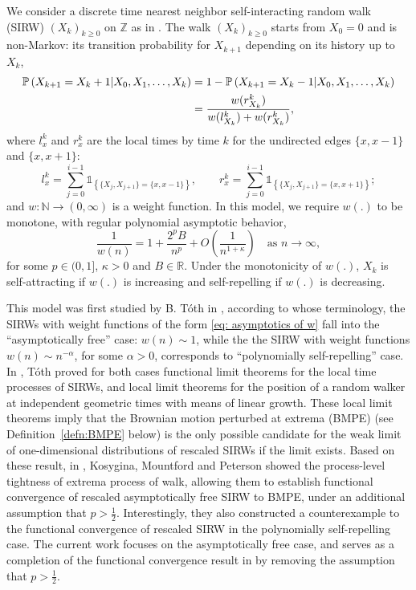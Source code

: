 \documentclass[twoside,12pt,a4paper]{article}
\numberwithin{equation}{section}
\newcommand\TBD{\textcolor{red}{TBD.}}
\begin{document}
	We consider a discrete time nearest neighbor self-interacting random walk (SIRW) $(X_k)_{k\geq 0}$ on $\mathbb{Z}$ as in \cite{T96,KMP22}. The walk $(X_k)_{k\geq 0}$ starts from $X_0 = 0$ and is non-Markov: its transition probability for $X_{k+1}$ depending on its history up to $X_k$, 
	\begin{align}
		\mathbb{P}\left( X_{k+1} =  X_k+1 \middle| X_0, X_1,\dots, X_k   \right) 
		&=1- \mathbb{P}\left( X_{k+1} =  X_k-1 \middle| X_0, X_1,\dots, X_k   \right)  
		\notag
		\\
		&=  \frac{  w(r_{X_k}^k)}{ w(l_{X_k}^k)  + w(r_{X_k}^k)   }
		, \label{dynamic}
	\end{align}
	where $l_x^k$ and $r_x^k$ are the local times by time $k$ for the undirected edges $\{x,x-1\}$ and $\{x,x+1\}$:
	\[ 
	l_x^k = \sum_{j=0}^{i-1} \mathbb{1}_{ \left\{  \{X_j, X_{j+1}\} =  \{x,x-1\} \right\} }, \qquad
	r_x^k = \sum_{j=0}^{i-1} \mathbb{1}_{ \left\{  \{X_j, X_{j+1}\} =  \{x,x+1\} \right\} }   
	;\]
	and $
	w: \mathbb{N} \to  (0, \infty )
	$ 
	is a weight function.
	In this model, we require $w(.)$ to be monotone, with regular polynomial asymptotic behavior,
	\begin{equation}\label{eq: asymptotics of w}
		\frac{1}{w(n)} = 1 + \frac{2^p B}{n^p} + O\left(\frac{1}{n^{1+\mathcal{\kappa}}}\right) \quad \mbox{as $n\to \infty$}, 	
	\end{equation} 
	for some $p \in (0,1]$, $\kappa>0$ and $B\in \mathbb{R}$. Under the monotonicity of $w(.)$, $X_k$ is self-attracting if $w(.)$ is increasing and self-repelling if $w(. )$ is decreasing.
	
	This model was first studied by B. T\'oth in \cite{T96}, according to whose terminology, the SIRWs with weight functions of the form \eqref{eq: asymptotics of w} fall into the ``asymptotically free'' case: $w(n)\sim 1$, while the the SIRW with weight functions $w(n)\sim n^{-\alpha}$, for some $\alpha >0$, corresponds to ``polynomially self-repelling'' case. In \cite{T96}, T\'oth proved for both cases functional limit theorems for the local time processes of SIRWs, 
	and local limit theorems for the position of a random walker at independent geometric times with means of linear growth. 
	These local limit theorems imply that the Brownian motion perturbed at extrema (BMPE) (see Definition~\ref{defn:BMPE} below) is the only possible candidate for the weak limit of one-dimensional distributions of rescaled SIRWs if the limit exists. 
	Based on these result, in \cite{KMP22}, Kosygina, Mountford and Peterson showed the process-level tightness of extrema process of walk, 
	allowing them to establish functional convergence of rescaled asymptotically free SIRW to BMPE, under an additional assumption that $p > \frac{1}{2}$. Interestingly, they also constructed a counterexample to the functional convergence of rescaled SIRW in the polynomially self-repelling case. The current work focuses on the asymptotically free case, and serves as a completion of the functional convergence result in \cite{KMP22} by removing the assumption that  $p > \frac{1}{2}$.
	
\end{document}
